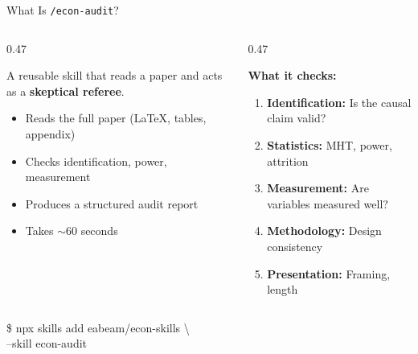 \documentclass[aspectratio=169, 10pt]{beamer}
\begin{document}


\begin{frame}[fragile]{What Is \texttt{/econ-audit}?}
\vskip-2pt
\begin{columns}[T]
\begin{column}{0.47\textwidth}
\begin{tcolorbox}[keybox, title={\faSearch\quad An Adversarial Review Skill}, top=3pt, bottom=3pt]
\small
A reusable skill that reads a paper and acts as a \textbf{skeptical referee}.
\vskip3pt
\begin{itemize}\setlength{\itemsep}{1pt}
  \item Reads the full paper (LaTeX, tables, appendix)
  \item Checks identification, power, measurement
  \item Produces a structured audit report
  \item Takes $\sim$60 seconds
\end{itemize}
\end{tcolorbox}

\end{column}
\begin{column}{0.47\textwidth}
\begin{tcolorbox}[accentbox, top=3pt, bottom=3pt]
\small
\textbf{What it checks:}
\vskip3pt
\begin{enumerate}\setlength{\itemsep}{1pt}
  \item \textbf{Identification:} Is the causal claim valid?
  \item \textbf{Statistics:} MHT, power, attrition
  \item \textbf{Measurement:} Are variables measured well?
  \item \textbf{Methodology:} Design consistency
  \item \textbf{Presentation:} Framing, length
\end{enumerate}
\end{tcolorbox}
\end{column}
\end{columns}
\vskip3pt
\begin{tcolorbox}[colback=DarkSlate, colframe=DarkSlate, arc=2pt,
  left=4pt, right=4pt, top=2pt, bottom=2pt]
{\color{CoolGray}\ttfamily\scriptsize \$ npx skills add eabeam/econ-skills \textbackslash\\
\quad\quad --skill econ-audit}
\end{tcolorbox}
\end{frame}
\end{document}

